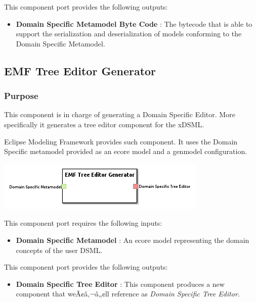 \documentclass{gemoc} %
\begin{document}
This component port provides the following outputs:
\begin{itemize}
  \item \textbf{Domain Specific Metamodel Byte Code} :
The bytecode that is able to support the serialization and deserialization of models conforming to the Domain Specific Metamodel.
\end{itemize}


\subsection{EMF Tree Editor Generator}


\subsubsection{Purpose}
This component is in charge of generating a Domain Specific Editor. More specifically it generates a tree editor component for the xDSML. 

Eclipse Modeling Framework provides such component. It uses the Domain Specific metamodel provided as an ecore model and a genmodel configuration.

\begin{center}
\includegraphics*[trim=0.0cm 0.0cm 0cm 0.0cm, clip=true]{../images/generated/Generated_EMF_Tree_Editor_Generator.png}
\end{center}

This component port requires the following inputs:
\begin{itemize}
  \item \textbf{Domain Specific Metamodel} :
An ecore model representing the domain concepts of the user DSML.
\end{itemize}

This component port provides the following outputs:
\begin{itemize}
  \item \textbf{Domain Specific Tree Editor} :
This component produces a new component that weÃ¢â‚¬â„¢ll reference as \emph{Domain Specific Tree Editor}.
\end{itemize}
\end{document}
